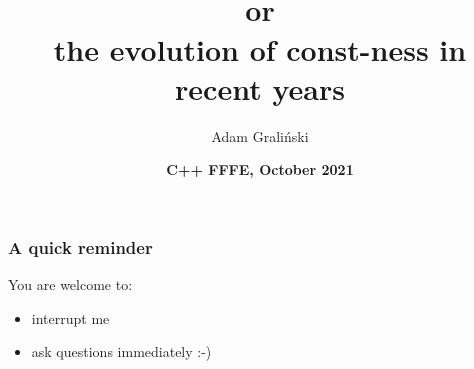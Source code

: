 \documentclass[aspectratio=169]{beamer}
\title[Friends\#10 :: \cpp{constexpr}]{\cpp{constexpr}\\
or\\
the evolution of const-ness in recent years
}
\author{Adam Graliński}
\date[FFFE\_21]{\textbf{C++ {\color{red}F}{\color{blue}F}{\color{green}F}{\color{yellow}E}, October 2021}}
\begin{document}
{
\begin{frame}
\titlepage{}
\end{frame}
}

\begin{frame}
\frametitle{A quick reminder}
You are welcome to:
\begin{itemize}
  \item{interrupt me}
  \item{ask questions immediately :-)}
\end{itemize}
\end{frame}
\end{document}
